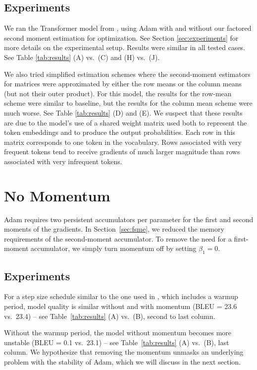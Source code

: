 \documentclass{article}
\begin{document}
\subsection{Experiments}
We ran the Transformer model from \citet{Vaswani17Attention}, using Adam with and without our factored second moment estimation for optimization.  See Section \ref{sec:experiments} for more details on the experimental setup.  Results were similar in all tested cases.  See Table \ref{tab:results} (A) vs.\ (C) and (H) vs.\ (J).  

We also tried simplified estimation schemes where the second-moment estimators for matrices were approximated by either the row means or the column means (but not their outer product).  For this model, the results for the row-mean scheme were similar to baseline, but the results for the column mean scheme were much worse.  See Table \ref{tab:results} (D) and (E).  We suspect that these results are due to the model's use of a shared weight matrix used both to represent the token embeddings and to produce the output probabilities. Each row in this matrix corresponds to one token in the vocabulary. Rows associated with very frequent tokens tend to receive gradients of much larger magnitude than rows associated with very infrequent tokens.

\section{No Momentum}

Adam requires two persistent accumulators per parameter for the first and second moments of the gradients.  In Section~\ref{sec:fsme}, we reduced the memory requirements of the second-moment accumulator.  To remove the need for a first-moment accumulator, we simply turn momentum off by setting $\beta_1=0$.

\subsection{Experiments}

For a step size schedule similar to the one used in \citet{Vaswani17Attention}, which includes a warmup period, model quality is similar without and with momentum (BLEU = 23.6 vs.\ 23.4) -- see Table~\ref{tab:results} (A) vs.\ (B), second to last column.

Without the warmup period, the model without momentum becomes more unstable (BLEU = 0.1 vs.\ 23.1) -- see Table~\ref{tab:results} (A) vs.\ (B), last column.   We hypothesize that removing the momentum unmasks an underlying problem with the stability of Adam, which we will discuss in the next section.
\end{document}
